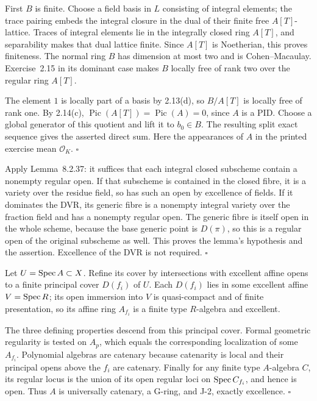 \documentclass[11pt]{article}
\let\chapterexercise\exercise
\renewcommand{\exercise}[2]{\Needspace{8\baselineskip}\chapterexercise{#1}{#2}}
\begin{document}
\pf
First $B$ is finite. Choose a field basis in $L$ consisting of integral elements; the trace pairing embeds the integral closure in the dual of their finite free $A[T]$-lattice. Traces of integral elements lie in the integrally closed ring $A[T]$, and separability makes that dual lattice finite. Since $A[T]$ is Noetherian, this proves finiteness. The normal ring $B$ has dimension at most two and is Cohen--Macaulay. Exercise~2.15 in its dominant case makes $B$ locally free of rank two over the regular ring $A[T]$.

The element $1$ is locally part of a basis by 2.13(d), so $B/A[T]$ is locally free of rank one. By 2.14(c), $\operatorname{Pic}(A[T])=\operatorname{Pic}(A)=0$, since $A$ is a PID. Choose a global generator of this quotient and lift it to $b_0\in B$. The resulting split exact sequence gives the asserted direct sum. Here the appearances of $A$ in the printed exercise mean $\mathcal O_K$. \hfill$\square$

\pf
Apply Lemma~8.2.37: it suffices that each integral closed subscheme contain a nonempty regular open. If that subscheme is contained in the closed fibre, it is a variety over the residue field, so has such an open by excellence of fields. If it dominates the DVR, its generic fibre is a nonempty integral variety over the fraction field and has a nonempty regular open. The generic fibre is itself open in the whole scheme, because the base generic point is $D(\pi)$, so this is a regular open of the original subscheme as well. This proves the lemma's hypothesis and the assertion. Excellence of the DVR is not required. \hfill$\square$

\pf
Let $U=\operatorname{Spec} A\subset X$. Refine its cover by intersections with excellent affine opens to a finite principal cover $D(f_i)$ of $U$. Each $D(f_i)$ lies in some excellent affine $V=\operatorname{Spec} R$; its open immersion into $V$ is quasi-compact and of finite presentation, so its affine ring $A_{f_i}$ is a finite type $R$-algebra and excellent.

The three defining properties descend from this principal cover. Formal geometric regularity is tested on $A_p$, which equals the corresponding localization of some $A_{f_i}$. Polynomial algebras are catenary because catenarity is local and their principal opens above the $f_i$ are catenary. Finally for any finite type $A$-algebra $C$, its regular locus is the union of its open regular loci on $\operatorname{Spec} C_{f_i}$, and hence is open. Thus $A$ is universally catenary, a G-ring, and J-2, exactly excellence. \hfill$\square$
\end{document}
